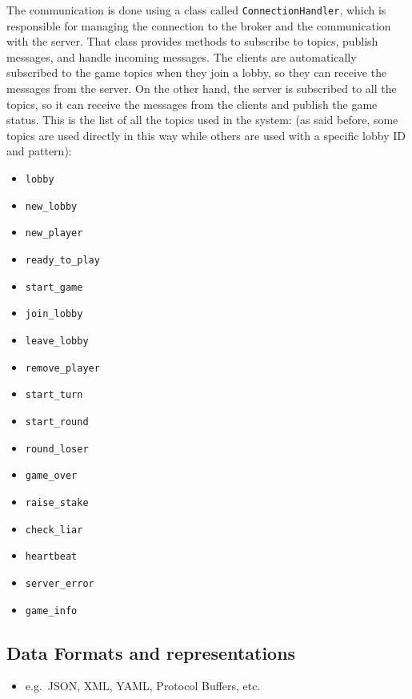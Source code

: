 \documentclass{scrartcl}
\begin{document}
The communication is done using a class called \texttt{ConnectionHandler}, which is responsible for managing the connection to the broker and the communication with the server. That class provides methods to subscribe to topics, publish messages, and handle incoming messages. \newline
The clients are automatically subscribed to the game topics when they join a lobby, so they can receive the messages from the server. On the other hand, the server is subscribed to all the topics, so it can receive the messages from the clients and publish the game status. \newline
This is the list of all the topics used in the system: (as said before, some topics are used directly in this way while others are used with a specific lobby ID and pattern): 
\begin{itemize}
    \item \texttt{lobby}
    \item \texttt{new\_lobby}
    \item \texttt{new\_player}
    \item \texttt{ready\_to\_play}
    \item \texttt{start\_game}
    \item \texttt{join\_lobby}
    \item \texttt{leave\_lobby}
    \item \texttt{remove\_player}
    \item \texttt{start\_turn}
    \item \texttt{start\_round}
    \item \texttt{round\_loser}
    \item \texttt{game\_over}
    \item \texttt{raise\_stake}
    \item \texttt{check\_liar}
    \item \texttt{heartbeat}
    \item \texttt{server\_error}
    \item \texttt{game\_info}
\end{itemize}
\subsection{Data Formats and representations}\label{data-formats}

\begin{itemize}
  \item e.g.~JSON, XML, YAML, Protocol Buffers, etc.
\end{itemize}
\end{document}
